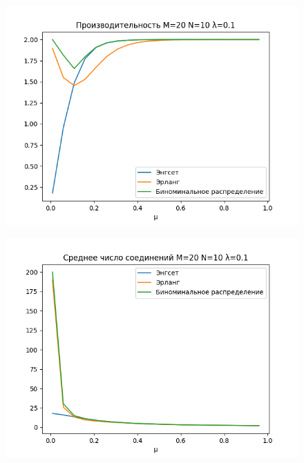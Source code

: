 \documentclass[12pt]{article}
\begin{document}
\begin{figure}[!htb]
\centering
\includegraphics[scale=1.00]{assets/iss_2/perf_M20_N10_lam01.png}
\caption{}
\label{}
\end{figure}

\begin{figure}[!htb]
\centering
\includegraphics[scale=1.00]{assets/iss_2/aver_conn_M20_N10_lam01.png}
\caption{}
\label{}
\end{figure}
\end{document}
